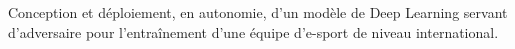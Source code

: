 Conception et déploiement, en autonomie, d’un modèle de Deep Learning servant d’adversaire pour l'entraînement d’une équipe d’e-sport de niveau international.

\sectionspace
